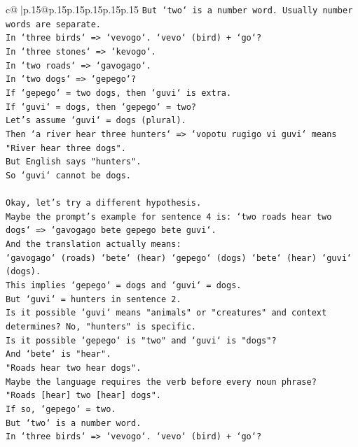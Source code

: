 \documentclass{article}
\begin{document}
{\begin{supertabular}{c@{$\;$}|p{.15\linewidth}@{}p{.15\linewidth}p{.15\linewidth}p{.15\linewidth}p{.15\linewidth}p{.15\linewidth}}
{{{\texttt{But `two` is a number word. Usually number words are separate.} \\
\texttt{In `three birds` => `vevogo`. `vevo` (bird) + `go`?} \\
\texttt{In `three stones` => `kevogo`.} \\
\texttt{In `two roads` => `gavogago`.} \\
\texttt{In `two dogs` => `gepego`?} \\
\texttt{If `gepego` = two dogs, then `guvi` is extra.} \\
\texttt{If `guvi` = dogs, then `gepego` = two?} \\
\texttt{Let's assume `guvi` = dogs (plural).} \\
\texttt{Then `a river hear three hunters` => `vopotu rugigo vi guvi` means "River hear three dogs".} \\
\texttt{But English says "hunters".} \\
\texttt{So `guvi` cannot be dogs.} \\
\\ 
\texttt{Okay, let's try a different hypothesis.} \\
\texttt{Maybe the prompt's example for sentence 4 is: `two roads hear two dogs` => `gavogago bete gepego bete guvi`.} \\
\texttt{And the translation actually means:} \\
\texttt{`gavogago` (roads) `bete` (hear) `gepego` (dogs) `bete` (hear) `guvi` (dogs).} \\
\texttt{This implies `gepego` = dogs and `guvi` = dogs.} \\
\texttt{But `guvi` = hunters in sentence 2.} \\
\texttt{Is it possible `guvi` means "animals" or "creatures" and context determines? No, "hunters" is specific.} \\
\texttt{Is it possible `gepego` is "two" and `guvi` is "dogs"?} \\
\texttt{And `bete` is "hear".} \\
\texttt{"Roads hear two hear dogs".} \\
\texttt{Maybe the language requires the verb before every noun phrase?} \\
\texttt{"Roads {[}hear{]} two {[}hear{]} dogs".} \\
\texttt{If so, `gepego` = two.} \\
\texttt{But `two` is a number word.} \\
\texttt{In `three birds` => `vevogo`. `vevo` (bird) + `go`?} \\
}}}
\end{supertabular}}
\end{document}
